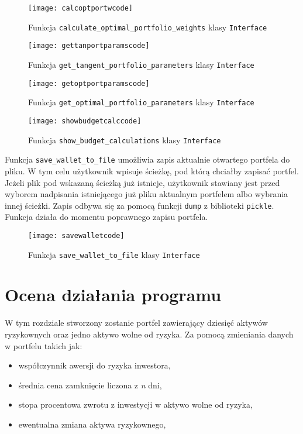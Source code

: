 \documentclass[magister]{dyplom}
\def\code#1{\texttt{#1}}
\begin{document}
\begin{figure}[ht]
	\centering
	\texttt{[image: calcoptportwcode]}
	\caption{Funkcja \code{calculate\_optimal\_portfolio\_weights} klasy \code{Interface}}
\end{figure}

\begin{figure}[h]
	\centering
	\texttt{[image: gettanportparamscode]}
	\caption{Funkcja \code{get\_tangent\_portfolio\_parameters} klasy \code{Interface}}
\end{figure}

\begin{figure}[h]
	\centering
	\texttt{[image: getoptportparamscode]}
	\caption{Funkcja \code{get\_optimal\_portfolio\_parameters} klasy \code{Interface}}
\end{figure}

\begin{figure}[h]
	\centering
	\texttt{[image: showbudgetcalccode]}
	\caption{Funkcja \code{show\_budget\_calculations} klasy \code{Interface}}
\end{figure}

\newpage
Funkcja \code{save\_wallet\_to\_file} umożliwia zapis aktualnie otwartego portfela do pliku. W tym celu użytkownik wpisuje ścieżkę, pod którą chciałby zapisać portfel. Jeżeli plik pod wskazaną ścieżką już istnieje, użytkownik stawiany jest przed wyborem nadpisania istniejącego już pliku aktualnym portfelem albo wybrania innej ścieżki. Zapis odbywa się za pomocą funkcji \code{dump} z biblioteki \code{pickle}. Funkcja działa do momentu poprawnego zapisu portfela.

\begin{figure}[h]
	\centering
	\texttt{[image: savewalletcode]}
	\caption{Funkcja \code{save\_wallet\_to\_file} klasy \code{Interface}}
\end{figure}
\chapter{Ocena działania programu}

W tym rozdziale stworzony zostanie portfel zawierający dziesięć aktywów ryzykownych oraz jedno aktywo wolne od ryzyka. Za pomocą zmieniania danych w portfelu takich jak:

\begin{itemize}
	\item współczynnik awersji do ryzyka inwestora,
	\item średnia cena zamknięcie liczona z \textit{n} dni,
	\item stopa procentowa zwrotu z inwestycji w aktywo wolne od ryzyka,
	\item ewentualna zmiana aktywa ryzykownego,
\end{itemize}
\end{document}
